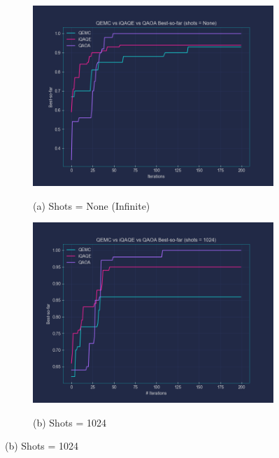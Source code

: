 \begin{figure}[ht!]
  \centering
  \begin{subfigure}[H]{0.495\textwidth}
      \centering
      \caption*{(a) Shots = None (Infinite)}
      \includegraphics[width=1\textwidth]{Figures/Chapter_5/3_Comparison_shots=None.png}
      \label{fig:3_Comparison_shots=None}
  \end{subfigure}
  \hspace{-1.5em}
  \begin{subfigure}[H]{0.495\textwidth}
      \centering
      \caption*{(b) Shots = 1024}
      \includegraphics[width=1\textwidth]{Figures/Chapter_5/3_Comparison_shots=1024.png}
      \label{fig:3_Comparison_shots=1024}
  \end{subfigure}


\end{figure}
